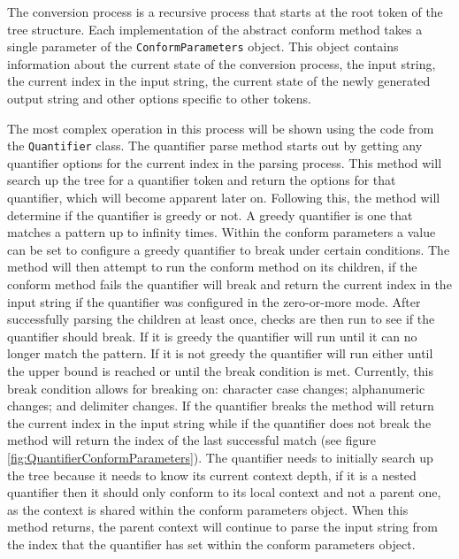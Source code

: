 The conversion process is a recursive process that starts at the root token of the tree structure. Each implementation of the abstract conform method takes a single parameter of the \texttt{ConformParameters} object. This object contains information about the current state of the conversion process, the input string, the current index in the input string, the current state of the newly generated output string and other options specific to other tokens.

The most complex operation in this process will be shown using the code from the \texttt{Quantifier} class. The quantifier parse method starts out by getting any quantifier options for the current index in the parsing process. This method will search up the tree for a quantifier token and return the options for that quantifier, which will become apparent later on. Following this, the method will determine if the quantifier is greedy or not. A greedy quantifier is one that matches a pattern up to infinity times. Within the conform parameters a value can be set to configure a greedy quantifier to break under certain conditions. The method will then attempt to run the conform method on its children, if the conform method fails the quantifier will break and return the current index in the input string if the quantifier was configured in the zero-or-more mode. After successfully parsing the children at least once, checks are then run to see if the quantifier should break. If it is greedy the quantifier will run until it can no longer match the pattern. If it is not greedy the quantifier will run either until the upper bound is reached or until the break condition is met. Currently, this break condition allows for breaking on: character case changes; alphanumeric changes; and delimiter changes. If the quantifier breaks the method will return the current index in the input string while if the quantifier does not break the method will return the index of the last successful match (see figure \ref{fig:QuantifierConformParameters}). The quantifier needs to initially search up the tree because it needs to know its current context depth, if it is a nested quantifier then it should only conform to its local context and not a parent one, as the context is shared within the conform parameters object. When this method returns, the parent context will continue to parse the input string from the index that the quantifier has set within the conform parameters object.



